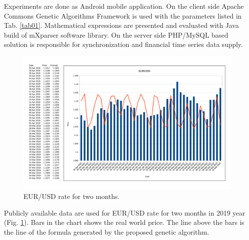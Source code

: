 \documentclass[graybox]{svmult}
\begin{document}
Experiments are done as Android mobile application. On the client side Apache Commons Genetic Algorithms Framework \cite{apache01} is used with the parameters listed in Tab. \ref{tab01}. Mathematical expressions are presented and evaluated with Java build of mXparser \cite{gromada01} software library. On the server side PHP/MySQL based solution \cite{balabanov03} is responsible for synchronization and financial time series data supply. 

\begin{figure}
\includegraphics[width=1.0\textwidth]{fig01.png}
\centering
\caption{EUR/USD rate for two months.} \label{fig01}
\end{figure}

Publicly available data are used for EUR/USD rate for two months in 2019 year (Fig. \ref{fig01}). Bars in the chart shows the real world price. The line above the bars is the line of the formula generated by the proposed genetic algorithm. 
\end{document}
